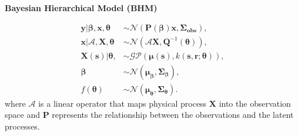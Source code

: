 \documentclass[portrait,a0paper,fontscale=0.29, margin = 8em, final]{baposter}
\begin{document}
\begin{poster}
{\begin{multicols}{3}
\begin{center}
\textbf{Bayesian Hierarchical Model (BHM)}
\end{center}
\begin{align*}
\bm{y} | \bm{\beta}, \bm{x}, \bm{\theta} &\sim \mathcal{N}(\bm{P}(\bm{\beta}) \bm{x}, \bm{\Sigma_{obs}}), \\
\bm{x} | \mathcal{A}, \bm{X}, \bm{\theta} &\sim \mathcal{N}(\mathcal{A}\bm{X}, \bm{Q}^{-1}(\bm{\theta})),\\
\bm{X(\bm{s})} | \bm{\theta}, &\sim \mathcal{GP} (\bm{\mu}(\bm{s}), k(\bm{s}, \bm{r}; \bm{\theta})), \\
\bm{\beta} &\sim \mathcal{N}(\bm{\mu}_{\bm{\beta}}, \bm{\Sigma}_{\bm{\beta}}),\\
f(\bm{\theta}) &\sim \mathcal{N}(\bm{\mu}_{\bm{\theta}}, \bm{\Sigma}_{\bm{\theta}}).
\end{align*}
\hspace{2em}where $\mathcal{A}$ is a linear operator that maps physical process $\bm{X}$ into the observation space and $\bm{P}$ represents the relationship between the observations and the latent processes.
\end{multicols}
}
\end{poster}
\end{document}
